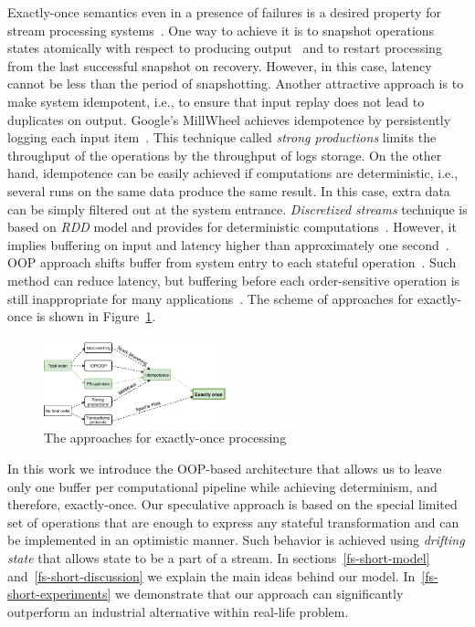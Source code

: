 \label {fs-short-intro}


Exactly-once semantics even in a presence of failures is a desired property for stream processing systems~\cite{Akidau:2013:MFS:2536222.2536229}. One way to achieve it is to snapshot operations states atomically with respect to producing output~\cite{Carbone:2017:SMA:3137765.3137777} and to restart processing from the last successful snapshot on recovery. However, in this case, latency cannot be less than the period of snapshotting. Another attractive approach is to make system idempotent, i.e., to ensure that input replay does not lead to duplicates on output. Google's MillWheel achieves idempotence by persistently logging each input item~\cite{Akidau:2013:MFS:2536222.2536229}. This technique called {\em strong productions} limits the throughput of the operations by the throughput of logs storage. On the other hand, idempotence can be easily achieved if computations are deterministic, i.e., several runs on the same data produce the same result. In this case, extra data can be simply filtered out at the system entrance. {\em Discretized streams} technique is based on {\em RDD} model and provides for deterministic computations~\cite{Zaharia:2012:DSE:2342763.2342773}. However, it implies buffering on input and latency higher than approximately one second~\cite{Qian:2013:TRS:2465351.2465353}. OOP approach shifts buffer from system entry to each stateful operation~\cite{Li:2008:OPN:1453856.1453890}. Such method can reduce latency, but buffering before each order-sensitive operation is still inappropriate for many applications~\cite{Zacheilas:2017:MDS:3093742.3093921}. The scheme of approaches for exactly-once is shown in Figure~\ref{approaches}.

\begin{figure}[ht]
  \centering
  \includegraphics[width=0.47\textwidth]{pics/intro-approaches}
  \caption{The approaches for exactly-once processing}
  \label {approaches}
\end{figure}

In this work we introduce the OOP-based architecture that allows us to leave only one buffer per computational pipeline while achieving determinism, and therefore, exactly-once. Our speculative approach is based on the special limited set of operations that are enough to express any stateful transformation and can be implemented in an optimistic manner. Such behavior is achieved using {\em drifting state} that allows state to be a part of a stream. In sections~\ref{fs-short-model} and~\ref{fs-short-discussion} we explain the main ideas behind our model. In~\ref{fs-short-experiments} we demonstrate that our approach can significantly outperform an industrial alternative within real-life problem. 